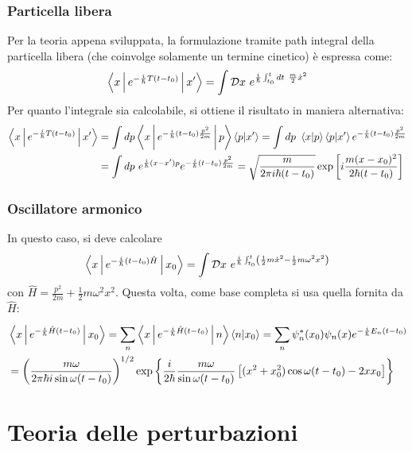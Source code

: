 \documentclass[11pt, a4paper]{scrartcl} %
\numberwithin{equation}{subsection}
\theoremstyle{style2}
\theoremstyle{style1}
\begin{document}
\subsubsection{Particella libera}

Per la teoria appena sviluppata, la formulazione tramite path integral della particella libera (che coinvolge solamente un termine cinetico) \`e espressa come:
\begin{equation}
	\Braket{x|e^{- \frac{i}{\hbar }T (t-t_0)} |x'} = \int \mathcal{D}  x \ e^{\frac{i}{\hbar } \int_{t_0} ^t dt\ \frac{m}{2}\dot{x}^2}  
\end{equation}
Per quanto l'integrale sia calcolabile, si ottiene il risultato in maniera alternativa:
\[
	\begin{split}
		\Braket{x|e^{-\frac{i}{\hbar }T (t-t_0)} |x'}  &= \int dp  \Braket{x|e^{-\frac{i}{\hbar }(t-t_0) \frac{p^2}{2m}} |p} \braket{p|x'} = \int dp \ \braket{x|p} \braket{p|x'} e^{-\frac{i}{\hbar } (t-t_0) \frac{p^2}{2m}} \\
							       &= \int dp \ e^{\frac{i}{\hbar }(x-x') p}  e^{-\frac{i}{\hbar }(t-t_0) \frac{p^2}{2m}} = \sqrt{\frac{m}{2\pi i \hbar (t-t_0)}}\exp \left[ i \frac{m (x-x_0)^2}{2\hbar (t-t_0)} \right]  
	\end{split}
\] 
\subsubsection{Oscillatore armonico}
In questo caso, si deve calcolare
\[
\Braket{x|e^{-\frac{i}{\hbar }(t-t_0) \hat{H}} |x_0} = \int \mathcal{D}  x \ e^{\frac{i}{\hbar }\int_{t_0} ^t \left(\frac{1}{2}m \dot{x}^2 - \frac{1}{2}m\omega^2 x^2\right) } 
\] 
con $\hat{H} = \frac{p^2 }{2m} + \frac{1}{2}m\omega^2 x^2$. 
Questa volta, come base completa si usa quella fornita da $\hat{H}$:
\begin{equation*}
	\begin{split}
		&\Braket{x|e^{-\frac{i}{\hbar } \hat{H} (t-t_0)} |x_0}  = \sum_{n}^{} \Braket{x|e^{-\frac{i}{\hbar } \hat{H} (t-t_0)} |n} \braket{n|x_0} = \sum_{n}^{} \psi _n^*(x_0) \psi _n(x) e^{-\frac{i}{\hbar } E_n (t-t_0)}\\
								       &=\left(\frac{m\omega}{2\pi \hbar  i \sin \omega (t-t_0)}\right) ^{ 1/2} \exp \left\{ \frac{i}{2 \hbar } \frac{m\omega}{\sin \omega(t-t_0)} \left[ (x^2 + x_0^2) \cos \omega(t-t_0) - 2 x x_0 \right] \right\} 
	\end{split}
\end{equation*}

\newpage
\section{Teoria delle perturbazioni}
\end{document}
